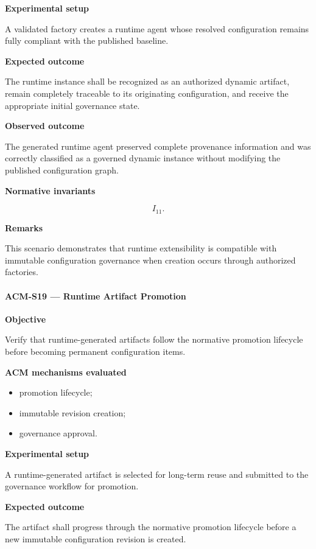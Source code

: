 \documentclass[10pt]{article}
\begin{document}
\textbf{Experimental setup}

A validated factory creates a runtime agent whose resolved configuration
remains fully compliant with the published baseline.

\textbf{Expected outcome}

The runtime instance shall be recognized as an authorized dynamic artifact,
remain completely traceable to its originating configuration, and receive the
appropriate initial governance state.

\textbf{Observed outcome}

The generated runtime agent preserved complete provenance information and was
correctly classified as a governed dynamic instance without modifying the
published configuration graph.

\textbf{Normative invariants}

\[
I_{11}.
\]

\textbf{Remarks}

This scenario demonstrates that runtime extensibility is compatible with
immutable configuration governance when creation occurs through authorized
factories.

\paragraph{ACM-S19 --- Runtime Artifact Promotion}

\textbf{Objective}

Verify that runtime-generated artifacts follow the normative promotion
lifecycle before becoming permanent configuration items.

\textbf{ACM mechanisms evaluated}

\begin{itemize}
    \item promotion lifecycle;
    \item immutable revision creation;
    \item governance approval.
\end{itemize}

\textbf{Experimental setup}

A runtime-generated artifact is selected for long-term reuse and submitted to
the governance workflow for promotion.

\textbf{Expected outcome}

The artifact shall progress through the normative promotion lifecycle before a
new immutable configuration revision is created.
\end{document}
